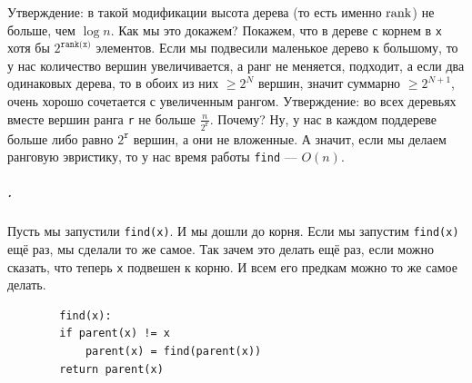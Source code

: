 \documentclass{article}
\newcommand{\pseudo}{PseudoLexer.py:PseudoLexer -x}
\newcommand{\pseudocode}[1]{\texttt{#1}}
\begin{document}
    Утверждение: в такой модификации высота дерева (то есть именно $\operatorname{rank}$) не больше, чем $\log n$. Как мы это докажем? Покажем, что в дереве с корнем в \pseudocode{x} хотя бы $2^{\pseudocode{rank(x)}}$ элементов. Если мы подвесили маленькое дерево к большому, то у нас количество вершин увеличивается, а ранг не меняется, подходит, а если два одинаковых дерева, то в обоих из них $\geqslant2^N$ вершин, значит суммарно $\geqslant 2^{N+1}$, очень хорошо сочетается с увеличенным рангом. Утверждение: во всех деревьях вместе вершин ранга \pseudocode{r} не больше $\frac n{2^{\pseudocode r}}$. Почему? Ну, у нас в каждом поддереве больше либо равно $2^{\pseudocode r}$ вершин, а они не вложенные. А значит, если мы делаем ранговую эвристику, то у нас время работы \pseudocode{find} --- $O(n)$.
    \subparagraph{.}
    Пусть мы запустили \pseudocode{find(x)}. И мы дошли до корня. Если мы запустим \pseudocode{find(x)} ещё раз, мы сделали то же самое. Так зачем это делать ещё раз, если можно сказать, что теперь \pseudocode{x} подвешен к корню. И всем его предкам можно то же самое делать.
    \begin{verbatim}
        find(x):
        if parent(x) != x
            parent(x) = find(parent(x))
        return parent(x)
    \end{verbatim}
\end{document}
